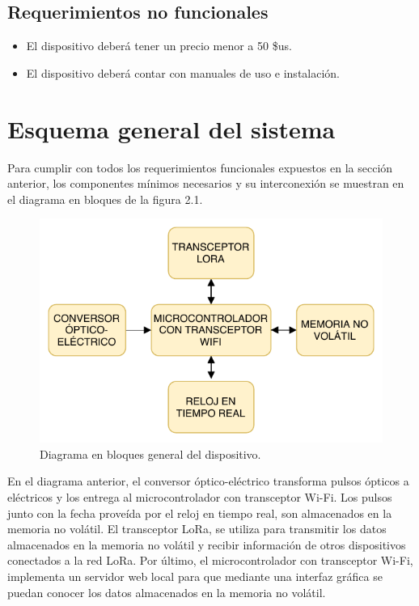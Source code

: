 \subsection{Requerimientos no funcionales}

\begin{itemize}
	\item El dispositivo deberá tener un precio menor a 50 \$us.
	\item El dispositivo deberá contar con manuales de uso e instalación.
\end{itemize}


\section{Esquema general del sistema}

Para cumplir con todos los requerimientos funcionales expuestos en la sección anterior, los componentes mínimos necesarios y su interconexión se muestran en el diagrama en bloques de la figura 2.1.

\begin{figure}[h]
	\centering
	\includegraphics[scale=1.2]{./Figures/general_blocks.pdf}
	\caption{Diagrama en bloques general del dispositivo.}
	\label{fig:cuadradoAzul}
\end{figure}

En el diagrama anterior, el conversor óptico-eléctrico transforma pulsos ópticos a eléctricos y los entrega al microcontrolador con transceptor Wi-Fi. Los pulsos junto con la fecha proveída por el reloj en tiempo real, son almacenados en la memoria no volátil. El transceptor LoRa, se utiliza para transmitir los datos almacenados en la memoria no volátil y recibir información de otros dispositivos conectados a la red LoRa. Por último, el microcontrolador con transceptor Wi-Fi, implementa un servidor web local para que mediante una interfaz gráfica se puedan conocer los datos almacenados en la memoria no volátil.

